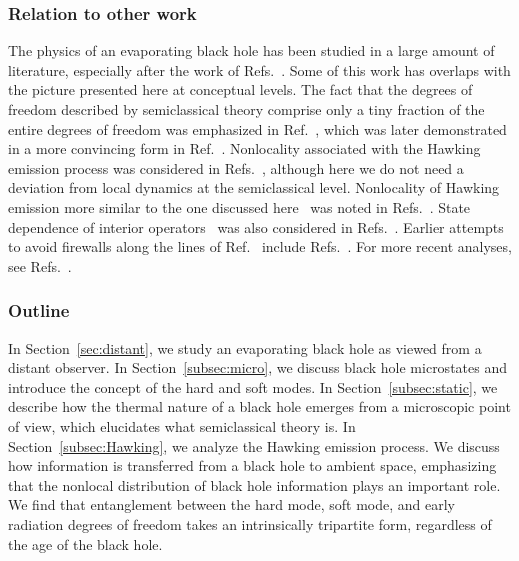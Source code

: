 \documentclass[12pt]{article}
\begin{document}
\subsubsection*{Relation to other work}

The physics of an evaporating black hole has been studied in 
a large amount of literature, especially after the work of 
Refs.~\cite{Almheiri:2012rt,Almheiri:2013hfa,Marolf:2013dba}. 
Some of this work has overlaps with the picture presented 
here at conceptual levels.  The fact that the degrees of 
freedom described by semiclassical theory comprise only a tiny 
fraction of the entire degrees of freedom was emphasized in 
Ref.~\cite{Nomura:2013lia}, which was later demonstrated in a 
more convincing form in Ref.~\cite{Almheiri:2014lwa}.  Nonlocality 
associated with the Hawking emission process was considered in 
Refs.~\cite{Giddings:2012bm,Giddings:2012gc,Giddings:2013kcj}, 
although here we do not need a deviation from local dynamics at the 
semiclassical level.  Nonlocality of Hawking emission more similar 
to the one discussed here~\cite{Nomura:2014woa,Nomura:2014voa,%
Nomura:2016qum} was noted in Refs.~\cite{Nomura:2014yka,%
Israel:2015ava,Giddings:2015uzr,Giddings:2017mym}.  State 
dependence of interior operators~\cite{Papadodimas:2012aq,%
Papadodimas:2013jku,Papadodimas:2015jra} was also considered 
in Refs.~\cite{Verlinde:2012cy,Nomura:2012ex,Verlinde:2013uja,%
Nomura:2013gna,Verlinde:2013qya}.  Earlier attempts to avoid 
firewalls along the lines of Ref.~\cite{Maldacena:2013xja} 
include Refs.~\cite{Bousso:2012as,Jacobson:2013ewa,%
Harlow:2013tf,Susskind:2013tg}.  For more recent analyses, 
see Refs.~\cite{deBoer:2018ibj,Hayden:2018khn,Almheiri:2018xdw}.

\subsubsection*{Outline}

In Section~\ref{sec:distant}, we study an evaporating black hole 
as viewed from a distant observer.  In Section~\ref{subsec:micro}, 
we discuss black hole microstates and introduce the concept of the 
hard and soft modes.  In Section~\ref{subsec:static}, we describe 
how the thermal nature of a black hole emerges from a microscopic 
point of view, which elucidates what semiclassical theory is. 
In Section~\ref{subsec:Hawking}, we analyze the Hawking emission 
process.  We discuss how information is transferred from a black 
hole to ambient space, emphasizing that the nonlocal distribution 
of black hole information plays an important role.  We find that 
entanglement between the hard mode, soft mode, and early radiation 
degrees of freedom takes an intrinsically tripartite form, regardless 
of the age of the black hole.
\end{document}
